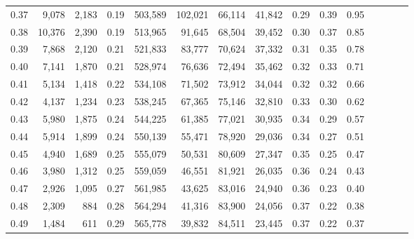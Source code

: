 \begin{tabular}{rrrcrrrrrrrrrrr}
0.37 &   9,078 &  2,183 &                                       0.19 &  503,589 &  102,021 &   66,114 &   41,842 &  0.29 &  0.39 &                         0.95 \\
0.38 &  10,376 &  2,390 &                                       0.19 &  513,965 &   91,645 &   68,504 &   39,452 &  0.30 &  0.37 &                         0.85 \\
0.39 &   7,868 &  2,120 &                                       0.21 &  521,833 &   83,777 &   70,624 &   37,332 &  0.31 &  0.35 &                         0.78 \\
0.40 &   7,141 &  1,870 &                                       0.21 &  528,974 &   76,636 &   72,494 &   35,462 &  0.32 &  0.33 &                         0.71 \\
0.41 &   5,134 &  1,418 &                                       0.22 &  534,108 &   71,502 &   73,912 &   34,044 &  0.32 &  0.32 &                         0.66 \\
0.42 &   4,137 &  1,234 &                                       0.23 &  538,245 &   67,365 &   75,146 &   32,810 &  0.33 &  0.30 &                         0.62 \\
0.43 &   5,980 &  1,875 &                                       0.24 &  544,225 &   61,385 &   77,021 &   30,935 &  0.34 &  0.29 &                         0.57 \\
0.44 &   5,914 &  1,899 &                                       0.24 &  550,139 &   55,471 &   78,920 &   29,036 &  0.34 &  0.27 &                         0.51 \\
0.45 &   4,940 &  1,689 &                                       0.25 &  555,079 &   50,531 &   80,609 &   27,347 &  0.35 &  0.25 &                         0.47 \\
0.46 &   3,980 &  1,312 &                                       0.25 &  559,059 &   46,551 &   81,921 &   26,035 &  0.36 &  0.24 &                         0.43 \\
0.47 &   2,926 &  1,095 &                                       0.27 &  561,985 &   43,625 &   83,016 &   24,940 &  0.36 &  0.23 &                         0.40 \\
0.48 &   2,309 &    884 &                                       0.28 &  564,294 &   41,316 &   83,900 &   24,056 &  0.37 &  0.22 &                         0.38 \\
0.49 &   1,484 &    611 &                                       0.29 &  565,778 &   39,832 &   84,511 &   23,445 &  0.37 &  0.22 &                         0.37 \\

\end{tabular}
